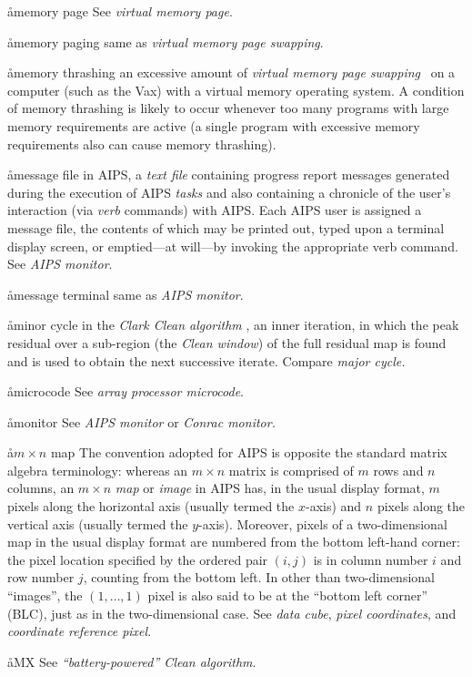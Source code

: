 \aa{memory page} See {\it virtual memory page}.

\aa{memory paging} same as {\it virtual memory page swapping}.

\aa{memory thrashing}
an excessive amount of {\it virtual memory page swapping}
\qv\ on a computer (such as the Vax) with a virtual memory operating system.
A condition of memory thrashing is likely to occur
whenever too many programs with large memory requirements are active
(a single program with excessive memory requirements
also can cause memory thrashing).

\aa{message file}
in AIPS, a {\it text file} containing progress report messages
generated during the execution of AIPS {\it tasks}
and also containing a chronicle of the user's interaction (via
{\it verb} commands) with AIPS.
Each AIPS user is assigned a message file, the contents of
which may be printed out, typed upon a terminal display screen,
or emptied---at will---by invoking the appropriate verb command.
See {\it AIPS monitor}.

\aa{message terminal}
same as {\it AIPS monitor}.

\aa{minor cycle}
in the {\it Clark Clean algorithm} \qv, an inner iteration,
in which the peak residual over a sub-region (the {\it Clean
window}\/) of the full residual map is found and is used to
obtain the next successive iterate.
Compare {\it major cycle.}

\aa{microcode} See {\it array processor microcode}.

\aa{monitor} See {\it AIPS monitor} or {\it Conrac monitor.}

\aa{$m\times n$ map}
The convention adopted for AIPS is opposite the standard
matrix algebra terminology:
whereas an $m\times n$ matrix is comprised of $m$ rows
and $n$ columns, an $m\times n$ {\it map} or {\it image}
in AIPS has, in the usual display format, $m$ pixels along
the horizontal axis (usually termed the $x$-axis) and $n$
pixels along the vertical axis (usually termed the $y$-axis).
Moreover, pixels of a two-dimensional map in the usual display format
are numbered from the bottom left-hand corner:  the pixel
location specified by the ordered pair $(i,j)$ is in column number
$i$ and row number $j$, counting from the bottom left.
In other than two-dimensional ``images'', the $(1,\dots,1)$
pixel is also said to be at the ``bottom left corner'' (BLC),
just as in the two-dimensional case.
See {\it data cube}, {\it pixel coordinates}, and {\it coordinate
reference pixel}.

\aa{MX} See {\it ``\/battery-powered'' Clean algorithm}.

